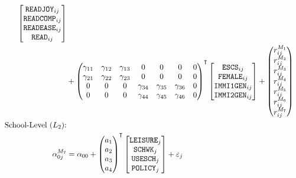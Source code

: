 \documentclass[a4paper,11pt,UKenglish,twoside,openright]{report}\usepackage[]{graphicx}\usepackage[]{color}
\begin{document}
\begin{equation}
\begin{aligned}
\begin{bmatrix}
            \texttt{READJOY}_{ij}\\
            \texttt{READCOMP}_{ij}\\
            \texttt{READEASE}_{ij}\\
            \texttt{READ}_{ij}
        \end{bmatrix}\\
        &+
        \begin{pmatrix}
            \gamma_{11}  &\gamma_{12}   &\gamma_{13}    &0  &0   &0   &0\\
            \gamma_{21}  &\gamma_{22}   &\gamma_{23}    &0  &0   &0   &0\\
            0   &0   &0  &\gamma_{34}   &\gamma_{35}    &\gamma_{36}  &0\\
            0   &0   &0  &\gamma_{44}   &\gamma_{45}    &\gamma_{46}  &0
        \end{pmatrix}\Ts
        \begin{bmatrix}
            \texttt{ESCS}_{ij}\\
            \texttt{FEMALE}_{ij}\\
            \texttt{IMMI1GEN}_{ij}\\
            \texttt{IMMI2GEN}_{ij}
        \end{bmatrix} +
        \begin{pmatrix}
            r^{M_1}_{ij}\\
            r^{M_2}_{ij}\\
            r^{M_3}_{ij}\\
            r^{M_4}_{ij}\\
            r^{M_5}_{ij}\\
            r^{M_6}_{ij}\\
            r^{M_7}_{ij}
        \end{pmatrix}\\
        \text{School-Level ($L_2$):}\\
        \alpha^{M_7}_{0j} &= \alpha_{00} +
        \begin{pmatrix}
            a_1\\
            a_2\\
            a_3\\
            a_4
        \end{pmatrix}\Ts
        \begin{bmatrix}
            \texttt{LEISURE}_j\\
            \texttt{SCHWK}_j\\
            \texttt{USESCH}_j\\
            \texttt{POLICY}_j
        \end{bmatrix}
        + \epsilon_j
    \end{aligned}
\end{equation}
\end{document}
